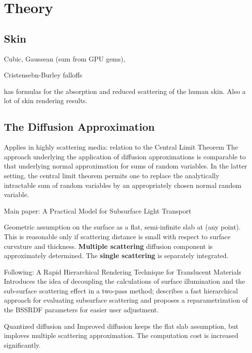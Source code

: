 \chapter{Theory}
\label{chapter:Theory}

\section{Skin}

Cubic, Gaussean (sum from GPU gems),

Cristensebn-Burley falloffs 

\cite{EGWR:EGSR06:409-417} has formulas for the absorption and reduced scattering of the human skin. Also a lot of skin rendering results.

\section{The Diffusion Approximation}
Applies in highly scattering media: relation to the Central Limit Theorem
The approach underlying the application of diffusion approximations is comparable to that underlying normal approximation for
sums of random variables. In the latter setting, the central limit theorem
permits one to replace the analytically intractable sum of random variables by
an appropriately chosen normal random variable.

Main paper: A Practical Model for Subsurface Light Transport \cite{Jensen:2001:PMS:383259.383319}

Geometric assumption on the surface as a flat, semi-infinite slab at (any
point). This is reasonable only if scattering distance is small with respect to
surface curvature and thickness. \textbf{Multiple scattering} diffusion
component is approximately determined. The \textbf{single scattering} is
separately integrated.

Following: A Rapid Hierarchical Rendering Technique for Translucent Materials\\
\cite{Jensen:2002:RHR:566570.566619} Introduces the idea of decoupling the calculations of surface
illumination and the sub-surface scattering effect in a two-pass method;
describes a fast hierarchical approach for evaluating subsurface scattering
and proposes a reparametrization of the BSSRDF parameters for easier user adjustment.

Quantized diffusion \cite{D'Eon:2011:QMR:1964921.1964951} and
Improved diffusion \cite{Habel:2013:PBD:2600890.2600896} keeps the flat slab
assumption, but imploves multiple scattering approximation. The computation cost
is increased significantly.

